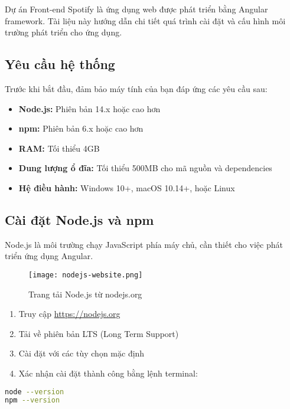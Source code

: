 \documentclass[12pt,a4paper]{article}
\begin{document}
Dự án Front-end Spotify là ứng dụng web được phát triển bằng Angular framework. Tài liệu này hướng dẫn chi tiết quá trình cài đặt và cấu hình môi trường phát triển cho ứng dụng.

\subsection{Yêu cầu hệ thống}

Trước khi bắt đầu, đảm bảo máy tính của bạn đáp ứng các yêu cầu sau:

\begin{tcolorbox}[colback=blue!5,colframe=blue!40!black,title=Yêu cầu cấu hình]
\begin{itemize}
  \item \textbf{Node.js:} Phiên bản 14.x hoặc cao hơn
  \item \textbf{npm:} Phiên bản 6.x hoặc cao hơn
  \item \textbf{RAM:} Tối thiểu 4GB
  \item \textbf{Dung lượng ổ đĩa:} Tối thiểu 500MB cho mã nguồn và dependencies
  \item \textbf{Hệ điều hành:} Windows 10+, macOS 10.14+, hoặc Linux
\end{itemize}
\end{tcolorbox}

\subsection{Cài đặt Node.js và npm}

Node.js là môi trường chạy JavaScript phía máy chủ, cần thiết cho việc phát triển ứng dụng Angular.

\begin{figure}[h]
\centering
\texttt{[image: nodejs-website.png]}
\caption{Trang tải Node.js từ nodejs.org}
\end{figure}

\begin{enumerate}
  \item Truy cập \url{https://nodejs.org}
  \item Tải về phiên bản LTS (Long Term Support)
  \item Cài đặt với các tùy chọn mặc định
  \item Xác nhận cài đặt thành công bằng lệnh terminal:
\end{enumerate}

\begin{lstlisting}[language=bash]
node --version
npm --version
\end{lstlisting}
\end{document}
